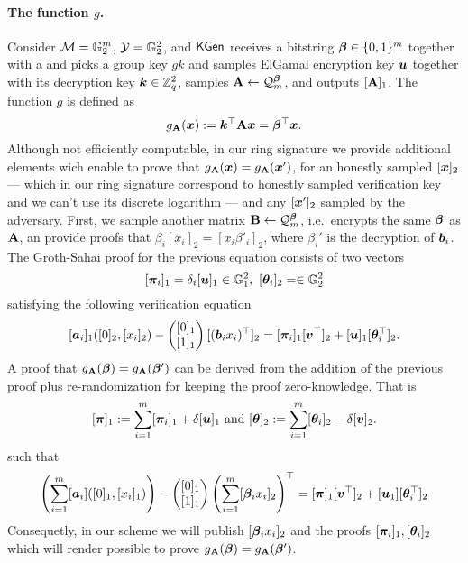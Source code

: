 \paragraph{The function $g$.} Consider $\mathcal{M}=\mathbb{G}^m_2$, $\mathcal{Y}=\mathbb{G}_2^2$, and $\mathsf{KGen}$ receives a bitstring ${\boldsymbol{\beta}}\in\{0,1\}^m$ together with a and picks a group key $gk$ and samples ElGamal encryption key ${\boldsymbol{u}}$ together with its decryption key ${\boldsymbol{k}}\in\mathbb{Z}_q^2$, samples $\mathbf{{A}}\gets\mathcal{Q}_m^{\boldsymbol{\beta}}$, and outputs $[\mathbf{{A}}]_1$. The function $g$ is defined as
$$
g_{\mathbf{{A}}}({\boldsymbol{x}}):= {\boldsymbol{k}}^\top\mathbf{{A}}{\boldsymbol{x}}={\boldsymbol{\beta}}^\top{\boldsymbol{x}}.
$$
Although not efficiently computable, in our ring signature we provide additional elements wich enable to prove that 
 $g_{\mathbf{{A}}}({\boldsymbol{x}}) = g_{\mathbf{{A}}}({\boldsymbol{x}}')$, for an honestly sampled $[{\boldsymbol{x}}]_2$ --- which in our ring signature correspond to honestly sampled verification key and we can't use its discrete logarithm ---  and any $[{\boldsymbol{x}}']_2$ sampled by the adversary.
First, we sample another matrix $\mathbf{{B}}\gets\mathcal{Q}_m^{\boldsymbol{\beta}}$, i.e.~encrypts the same ${\boldsymbol{\beta}}$ as $\mathbf{{A}}$, an provide proofs that $\beta_i[x_i]_2=[x_i\beta'_i]_2$, where $\beta_i'$ is the decryption of ${\boldsymbol{b}}_i$.
 The Groth-Sahai proof for the previous equation consists of two vectors
$$[{\boldsymbol{\pi}}_i]_1 = \delta_i[{\boldsymbol{u}}]_1\in\mathbb{G}_1^2,\ [{\boldsymbol{\theta}}_i]_2=\in\mathbb{G}_2^2$$ satisfying the following verification equation
$$ 
[{\boldsymbol{a}}_i]_1([0]_2, {[x_i]_2})-\left(\begin{matrix}[0]_1\\{[1]_1}\end{matrix}\right)[({\boldsymbol{b}}_ix_i)^\top]_2 =[{\boldsymbol{\pi}}_i]_1[{\boldsymbol{v}}^\top]_2+[{\boldsymbol{u}}]_1[{\boldsymbol{\theta}}^\top_i]_2.
$$
A proof that $g_{\mathbf{{A}}}({\boldsymbol{\beta}}) = g_{\mathbf{{A}}}({\boldsymbol{\beta}}')$ can be derived from the addition of the previous proof plus re-randomization for keeping the proof zero-knowledge. That is
$$
[{\boldsymbol{\pi}}]_1 := \sum_{i=1}^m [{\boldsymbol{\pi}}_i]_1+\delta[{\boldsymbol{u}}]_1
\text{ and }
[{\boldsymbol{\theta}}]_2 := \sum_{i=1}^m [{\boldsymbol{\theta}}_i]_2-\delta[{\boldsymbol{v}}]_2.
$$
such that
$$
\left(\sum_{i=1}^m [{\boldsymbol{a}}_i]([0]_1,[x_i]_1)\right)-\left(\begin{matrix}{[0]_1}\\{[1]_1}\end{matrix}\right)\left(\sum_{i=1}^m[{\boldsymbol{\beta}}_ix_i]_2\right)^\top =
[{\boldsymbol{\pi}}]_1[{\boldsymbol{v}}^\top]_2 + [{\boldsymbol{u}}_1][{\boldsymbol{\theta}}_i^\top]_2
$$ Consequetly, in our scheme we will publish  $[{\boldsymbol{\beta}}_ix_i]_2$ and the proofs $[{\boldsymbol{\pi}}_i]_1,[{\boldsymbol{\theta}}_i]_2$ which will render possible to prove $g_{\mathbf{{A}}}({\boldsymbol{\beta}})=g_{\mathbf{{A}}}({\boldsymbol{\beta}}')$.


